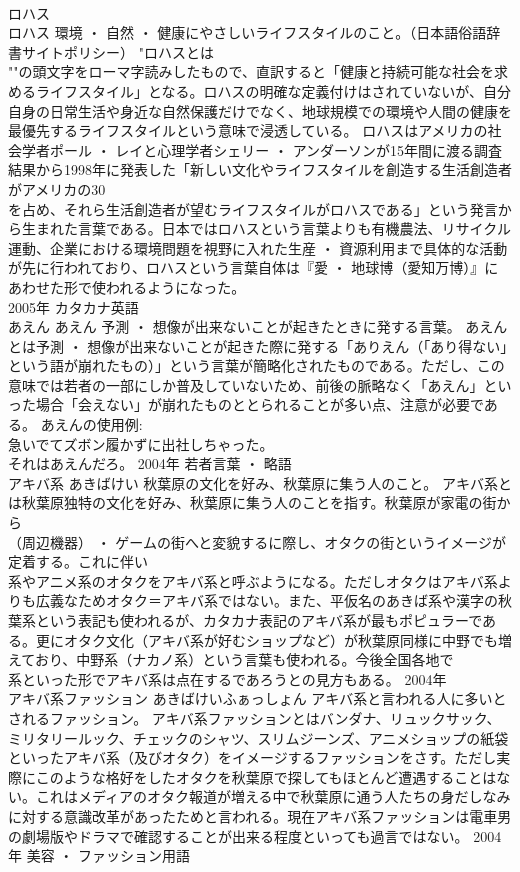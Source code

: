 \documentclass[8pt]{extreport}
\begin{document}
\begin{CJK}{UTF8}{min}
\\	ロハス 
\\	ロハス	環境 ・ 自然 ・ 健康にやさしいライフスタイルのこと。（日本語俗語辞書サイトポリシー）	"ロハスとは
\\	""の頭文字をローマ字読みしたもので、直訳すると「健康と持続可能な社会を求めるライフスタイル」となる。ロハスの明確な定義付けはされていないが、自分自身の日常生活や身近な自然保護だけでなく、地球規模での環境や人間の健康を最優先するライフスタイルという意味で浸透している。 ロハスはアメリカの社会学者ポール ・ レイと心理学者シェリー ・ アンダーソンが15年間に渡る調査結果から1998年に発表した「新しい文化やライフスタイルを創造する生活創造者がアメリカの30
\\	を占め、それら生活創造者が望むライフスタイルがロハスである」という発言から生まれた言葉である。日本ではロハスという言葉よりも有機農法、リサイクル運動、企業における環境問題を視野に入れた生産 ・ 資源利用まで具体的な活動が先に行われており、ロハスという言葉自体は『愛 ・ 地球博（愛知万博）』にあわせた形で使われるようになった。
\\	2005年	カタカナ英語	
\\	あえん	あえん	予測 ・ 想像が出来ないことが起きたときに発する言葉。	あえんとは予測 ・ 想像が出来ないことが起きた際に発する「ありえん（「あり得ない」という語が崩れたもの）」という言葉が簡略化されたものである。ただし、この意味では若者の一部にしか普及していないため、前後の脈略なく「あえん」といった場合「会えない」が崩れたものととられることが多い点、注意が必要である。 あえんの使用例: 
\\	急いでてズボン履かずに出社しちゃった。 
\\	それはあえんだろ。	2004年	若者言葉 ・ 略語	
\\	アキバ系	あきばけい	秋葉原の文化を好み、秋葉原に集う人のこと。	アキバ系とは秋葉原独特の文化を好み、秋葉原に集う人のことを指す。秋葉原が家電の街から
\\	（周辺機器） ・ ゲームの街へと変貌するに際し、オタクの街というイメージが定着する。これに伴い
\\	系やアニメ系のオタクをアキバ系と呼ぶようになる。ただしオタクはアキバ系よりも広義なためオタク＝アキバ系ではない。また、平仮名のあきば系や漢字の秋葉系という表記も使われるが、カタカナ表記のアキバ系が最もポピュラーである。更にオタク文化（アキバ系が好むショップなど）が秋葉原同様に中野でも増えており、中野系（ナカノ系）という言葉も使われる。今後全国各地で
\\	系といった形でアキバ系は点在するであろうとの見方もある。	2004年	
\\	アキバ系ファッション	あきばけいふぁっしょん	アキバ系と言われる人に多いとされるファッション。	アキバ系ファッションとはバンダナ、リュックサック、ミリタリールック、チェックのシャツ、スリムジーンズ、アニメショップの紙袋といったアキバ系（及びオタク）をイメージするファッションをさす。ただし実際にこのような格好をしたオタクを秋葉原で探してもほとんど遭遇することはない。これはメディアのオタク報道が増える中で秋葉原に通う人たちの身だしなみに対する意識改革があったためと言われる。現在アキバ系ファッションは電車男の劇場版やドラマで確認することが出来る程度といっても過言ではない。	2004年	美容 ・ ファッション用語	

\end{CJK}
\end{document}
